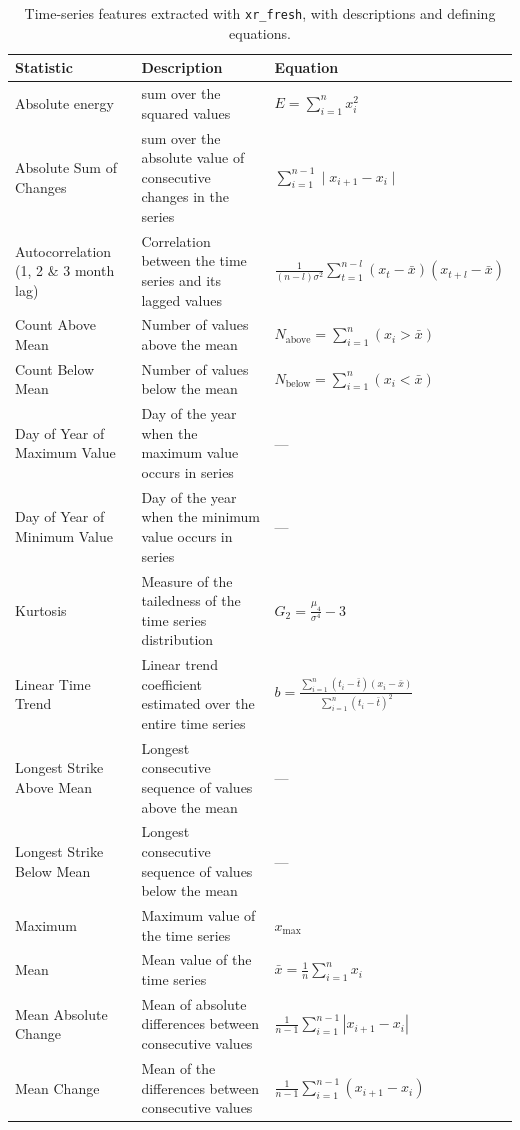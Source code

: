 \documentclass[
  journal,
  onecolumn]{IEEEtran}
\begin{document}
\renewcommand{\arraystretch}{1.5}
\begin{longtable}{|p{4cm}|p{5cm}|p{6cm}|}
\caption{Time-series features extracted with \texttt{xr\_fresh}, with descriptions and defining equations.}\label{tab:ts_features}\\
\hline
\textbf{Statistic} & \textbf{Description} & \textbf{Equation} \\
\hline
\endhead
Absolute energy &  sum over the squared values & $E = \sum_{i=1}^n x_i^2$ \\
Absolute Sum of Changes  & sum over the absolute value of consecutive changes in the series  & $ \sum_{i=1}^{n-1} \mid x_{i+1}- x_i \mid $ \\
Autocorrelation (1, 2 \& 3 month lag) & Correlation between the time series and its lagged values & $\frac{1}{(n-l)\sigma^{2}} \sum_{t=1}^{n-l}(x_{t}-\bar{x})(x_{t+l}-\bar{x})$\\
Count Above Mean & Number of values above the mean & $N_{\text{above}} = \sum_{i=1}^n (x_i > \bar{x})$ \\
Count Below Mean & Number of values below the mean & $N_{\text{below}} = \sum_{i=1}^n (x_i < \bar{x})$ \\
Day of Year of Maximum Value & Day of the year when the maximum value occurs in series & --- \\
Day of Year of Minimum Value & Day of the year when the minimum value occurs in series & --- \\
Kurtosis & Measure of the tailedness of the time series distribution & $G_2 = \frac{\mu_4}{\sigma^4} - 3$ \\
Linear Time Trend & Linear trend coefficient estimated over the entire time series & $b = \frac{\sum_{i=1}^n (t_i - \bar{t})(x_i - \bar{x})}{\sum_{i=1}^n (t_i - \bar{t})^2}$ \\
Longest Strike Above Mean & Longest consecutive sequence of values above the mean & --- \\
Longest Strike Below Mean & Longest consecutive sequence of values below the mean & --- \\
Maximum & Maximum value of the time series & $x_{\text{max}}$ \\
Mean & Mean value of the time series & $\bar{x} = \frac{1}{n}\sum_{i=1}^n x_i$ \\
Mean Absolute Change & Mean of absolute differences between consecutive values & $\frac{1}{n-1} \sum_{i=1}^{n-1} | x_{i+1} - x_{i}|$ \\
Mean Change & Mean of the differences between consecutive values & $ \frac{1}{n-1} \sum_{i=1}^{n-1}  (x_{i+1} - x_{i}) $ \\

\end{longtable}
\end{document}
